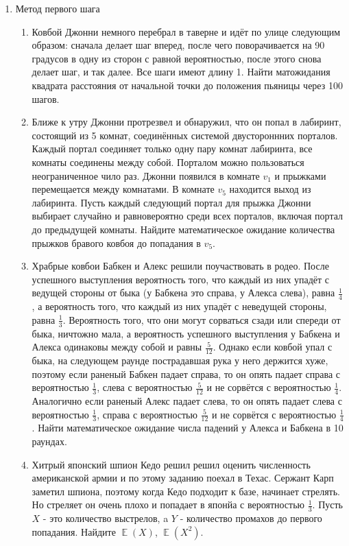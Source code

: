 \documentclass[11pt, a4paper]{article}
\DeclareMathOperator{\E}{\mathbb{E}}
\theoremstyle{definition}
\begin{document}
\begin{enumerate}
    \item Метод первого шага
\begin{enumerate}
    \item Ковбой Джонни немного перебрал в таверне и идёт по улице следующим образом: сначала делает шаг вперед, после чего поворачивается на 90 градусов в одну из сторон с равной вероятностью, после этого снова делает шаг, и так далее. Все шаги имеют длину 1. Найти матожидания квадрата расстояния от начальной точки до положения пьяницы через 100 шагов.
    \item Ближе к утру Джонни протрезвел и обнаружил, что он попал в лабиринт, состоящий из 5 комнат, соединённых системой двустороннних порталов. Каждый портал соединяет только одну пару комнат лабиринта, все комнаты соединены между собой. Порталом можно пользоваться неограниченное чило раз. Джонни появился в комнате $v_1$ и прыжками перемещается между комнатами. В комнате $v_5$ находится выход из лабиринта. Пусть каждый следующий портал для прыжка Джонни выбирает случайно и равновероятно среди всех порталов, включая портал до предыдущей комнаты. Найдите математическое ожидание количества прыжков бравого ковбоя до попадания в $v_5$.
    \item Храбрые ковбои Бабкен и Алекс решили поучаствовать в родео. После успешного выступления  вероятность того, что каждый из них упадёт с ведущей стороны от быка (у Бабкена это справа, у Алекса слева), равна $\frac{1}{4}$, а вероятность того, что каждый из них упадёт с неведущей стороны, равна $\frac{1}{3}$. Вероятность того, что они могут сорваться сзади или спереди от быка, ничтожно мала, а вероятность успешного выступления у Бабкена и Алекса одинаковы между собой и равны $\frac{5}{12}$. Однако если ковбой упал с быка, на следующем раунде пострадавшая рука у него держится хуже, поэтому если раненый Бабкен падает справа, то он опять падает справа с вероятностью $\frac{1}{3}$, слева с вероятностью $\frac{5}{12}$ и не сорвётся с вероятностью $\frac{1}{4}$. Аналогично если раненый Алекс падает слева, то он опять падает слева с вероятностью $\frac{1}{3}$, справа с вероятностью $\frac{5}{12}$ и не сорвётся с вероятностью $\frac{1}{4}$. Найти математическое ожидание числа падений у Алекса и Бабкена в 10 раундах.
    \item Хитрый японский шпион Кедо решил решил оценить численность американской армии и по этому заданию поехал в Техас. Сержант Карп заметил шпиона, поэтому когда Кедо подходит к базе, начинает стрелять. Но стреляет он очень плохо и попадает в японйа с вероятностью $\frac{1}{3}$. Пусть $X$ - это количество выстрелов, a $Y$ - количество промахов до первого попадания. Найдите $\E(X)$, $\E(X^2)$.

\end{enumerate}
\end{enumerate}
\end{document}
